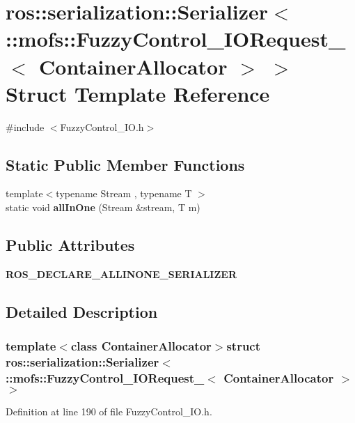 \section{ros\-:\-:serialization\-:\-:Serializer$<$ \-:\-:mofs\-:\-:Fuzzy\-Control\-\_\-\-I\-O\-Request\-\_\-$<$ Container\-Allocator $>$ $>$ Struct Template Reference}
\label{structros_1_1serialization_1_1Serializer_3_01_1_1mofs_1_1FuzzyControl__IORequest___3_01ContainerAllocator_01_4_01_4}


{\ttfamily \#include $<$Fuzzy\-Control\-\_\-\-I\-O.\-h$>$}

\subsection*{Static Public Member Functions}
\begin{DoxyCompactItemize}
\item 
{\footnotesize template$<$typename Stream , typename T $>$ }\\static void {\bf all\-In\-One} (Stream \&stream, T m)
\end{DoxyCompactItemize}
\subsection*{Public Attributes}
\begin{DoxyCompactItemize}
\item 
{\bf R\-O\-S\-\_\-\-D\-E\-C\-L\-A\-R\-E\-\_\-\-A\-L\-L\-I\-N\-O\-N\-E\-\_\-\-S\-E\-R\-I\-A\-L\-I\-Z\-E\-R}
\end{DoxyCompactItemize}


\subsection{Detailed Description}
\subsubsection*{template$<$class Container\-Allocator$>$struct ros\-::serialization\-::\-Serializer$<$ \-::mofs\-::\-Fuzzy\-Control\-\_\-\-I\-O\-Request\-\_\-$<$ Container\-Allocator $>$ $>$}



Definition at line 190 of file Fuzzy\-Control\-\_\-\-I\-O.\-h.



